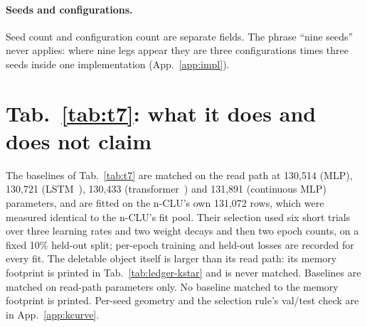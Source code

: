 \documentclass{article} %
\begin{document}
\paragraph{Seeds and configurations.} Seed count and configuration count are separate fields. The
phrase ``nine seeds'' never applies: where nine legs appear they are three configurations times
three seeds inside one implementation (App.~\ref{app:impl}).

\section{Tab.~\ref{tab:t7}: what it does and does not claim}
\label{app:t7more}
The baselines of Tab.~\ref{tab:t7} are matched on the read path at 130,514 (MLP), 130,721 (LSTM~\citep{hochreiter_long_1997}), %
130,433 (transformer~\citep{vaswani_attention_2023}) and 131,891 (continuous MLP) parameters, and are fitted on the n-CLU's own %
131,072 rows, which were measured identical to the n-CLU's fit pool. Their selection used six short %
trials over three learning rates and two weight decays and then two epoch counts, on a fixed 10\%
held-out split; per-epoch training and held-out losses are recorded for every fit. %
The deletable object itself is larger than its read path: its memory footprint is printed
in Tab.~\ref{tab:ledger-kstar} and is never matched. Baselines are matched on read-path
parameters only. No baseline matched to the memory footprint is printed.
Per-seed geometry and the selection rule's val/test check are in App.~\ref{app:kcurve}.
\end{document}

